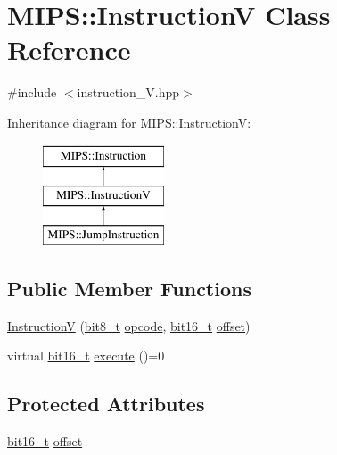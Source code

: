 \hypertarget{classMIPS_1_1InstructionV}{}\section{M\+I\+PS\+:\+:InstructionV Class Reference}
\label{classMIPS_1_1InstructionV}


{\ttfamily \#include $<$instruction\+\_\+\+V.\+hpp$>$}

Inheritance diagram for M\+I\+PS\+:\+:InstructionV\+:\begin{figure}[H]
\begin{center}
\leavevmode
\includegraphics[height=3.000000cm]{classMIPS_1_1InstructionV}
\end{center}
\end{figure}
\subsection*{Public Member Functions}
\begin{DoxyCompactItemize}
\item 
\hyperlink{classMIPS_1_1InstructionV_a258d90fae989725cbada7cd80a626d73}{InstructionV} (\hyperlink{core_8hpp_a6074bae122ae7b527864eec42c728c3c}{bit8\+\_\+t} \hyperlink{classMIPS_1_1Instruction_a45cc6808b5dde8a5d41067d148b55476}{opcode}, \hyperlink{core_8hpp_adc265a970bc35995b5879784bbb3f1b7}{bit16\+\_\+t} \hyperlink{classMIPS_1_1InstructionV_ac2e294fde4971aa6a149480f22ae29e9}{offset})
\item 
virtual \hyperlink{core_8hpp_adc265a970bc35995b5879784bbb3f1b7}{bit16\+\_\+t} \hyperlink{classMIPS_1_1InstructionV_a511d8ba098bcca95f1e91ff6616470ef}{execute} ()=0
\end{DoxyCompactItemize}
\subsection*{Protected Attributes}
\begin{DoxyCompactItemize}
\item 
\hyperlink{core_8hpp_adc265a970bc35995b5879784bbb3f1b7}{bit16\+\_\+t} \hyperlink{classMIPS_1_1InstructionV_ac2e294fde4971aa6a149480f22ae29e9}{offset}
\end{DoxyCompactItemize}


